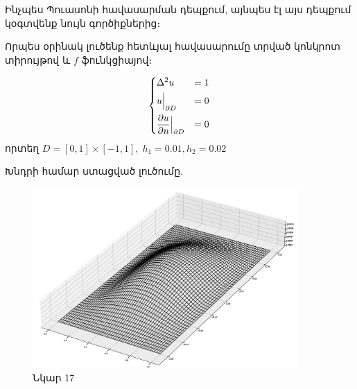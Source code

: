 \documentclass[fleqn, bachelor,subf,12pt,notitlepage]{article}
\begin{document}
Ինչպես Պուասոնի հավասարման դեպքում, այնպես էլ այս դեպքում կօգտվենք նույն գործիքներից։

Որպես օրինակ լուծենք հետևյալ հավասարումը տրված կոնկրոտ տիրույթով և $f$ ֆունկցիայով։

$$\begin{dcases}
								\Delta^{2} u &=1 \\
								u \Big |_{\partial D} &= 0\\
								\dfrac{\partial u}{\partial n} \Big |_{\partial D} &= 0
\end{dcases}$$
որտեղ $D = \left[0, 1\right] \times \left[-1, 1\right], \; h_{1}=0.01, h_{2}=0.02$

\noindent Խնդրի համար ստացված լուծումը.
\begin{figure}[h!]
\centering
\includegraphics[width=0.9\textwidth]{images/biharmonic_equation_solution}
\caption{\hfill Նկար 17}
\end{figure}
\end{document}
